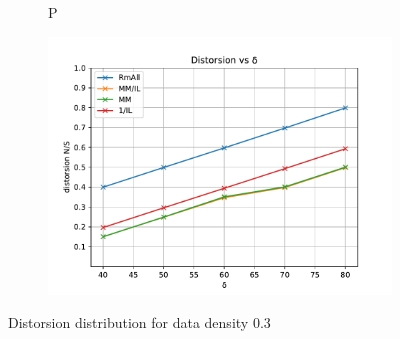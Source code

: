 \documentclass{beamer}
\begin{document}
\begin{frame}[fragile]
\begin{figure}
\begin{subfigure}[b]{0.32\linewidth}
            \caption{P}\label{fig1a}
    \end{subfigure}
    \begin{subfigure}[c]{0.32\linewidth}
        \centering
            \includegraphics[width=\linewidth]{img/plt_ds_x10000_y20_d03_delta_}
            \caption{\delta}\label{fig1b}
    \end{subfigure}
\caption{Distorsion distribution for data density 0.3}
\end{figure}


\end{frame}
\end{document}
